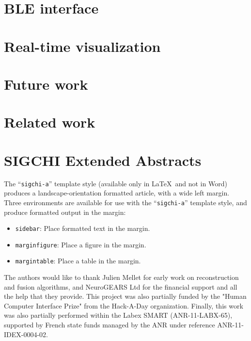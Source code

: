 \documentclass[sigchi-a]{acmart}
\begin{document}
\section{BLE interface}

\section{Real-time visualization}

\section{Future work}

\section{Related work}

\section{SIGCHI Extended Abstracts}

The ``\verb|sigchi-a|'' template style (available only in \LaTeX\ and
not in Word) produces a landscape-orientation formatted article, with
a wide left margin. Three environments are available for use with the
``\verb|sigchi-a|'' template style, and produce formatted output in
the margin:
\begin{itemize}
\item {\verb|sidebar|}:  Place formatted text in the margin.
\item {\verb|marginfigure|}: Place a figure in the margin.
\item {\verb|margintable|}: Place a table in the margin.
\end{itemize}

\begin{acks}
The authors would like to thank Julien Mellet for early work on reconstruction and fusion algorithms, and NeuroGEARS Ltd for the financial support and all the help that they provide. This project was also partially funded by the "Human Computer Interface Prize" from the Hack-A-Day organization. Finally, this work was also partially performed within the Labex SMART (ANR-11-LABX-65), supported by French state funds managed by the ANR under reference ANR-11-IDEX-0004-02.
\end{acks}




\end{document}
